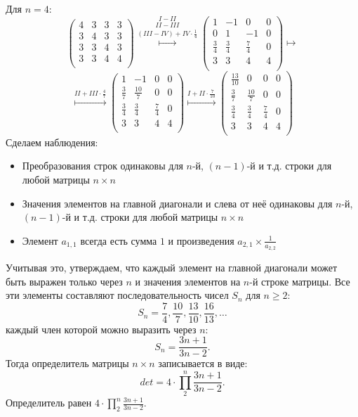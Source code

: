 \documentclass[a4paper,12pt]{article}
\begin{document}
\par
Для $n=4$:
$$
\begin{pmatrix}
4 & 3 & 3 & 3\\
3 & 4 & 3 & 3\\
3 & 3 & 4 & 3\\
3 & 3 & 4 & 4\\
\end{pmatrix}
\overset{I-II}{\overset{II-III}{\overset{(III-IV) + IV \cdot \frac{1}{4}}{\longmapsto}}}
\begin{pmatrix}
1 & -1 & 0 & 0\\
0 & 1 & -1 & 0\\
\frac{3}{4} & \frac{3}{4} & \frac{7}{4} & 0\\
3 & 3 & 4 & 4\\
\end{pmatrix}
\longmapsto
$$
$$
\overset{II+III \cdot \frac{4}{7}}{\longmapsto}
\begin{pmatrix}
1 & -1 & 0 & 0\\
\frac{3}{7} & \frac{10}{7} & 0 & 0\\
\frac{3}{4} & \frac{3}{4} & \frac{7}{4} & 0\\
3 & 3 & 4 & 4\\
\end{pmatrix}
\overset{I+II \cdot \frac{7}{10}}{\longmapsto}
\begin{pmatrix}
\frac{13}{10} & 0 & 0 & 0\\
\frac{3}{7} & \frac{10}{7} & 0 & 0\\
\frac{3}{4} & \frac{3}{4} & \frac{7}{4} & 0\\
3 & 3 & 4 & 4\\
\end{pmatrix}
$$
Сделаем наблюдения:
\begin{itemize}
\item Преобразования строк одинаковы для $n$-й, $(n-1)$-й и т.д. строки для любой матрицы $n \times n$
\item Значения элементов на главной диагонали и слева от неё одинаковы для $n$-й, $(n-1)$-й и т.д. строки для любой матрицы $n \times n$
\item Элемент $a_{1,1}$ всегда есть сумма $1$ и произведения $a_{2,1} \times \frac{1}{a_{2,2}}$
\end{itemize}
Учитывая это, утверждаем, что каждый элемент на главной диагонали может быть выражен только через $n$ и значения элементов на $n$-й строке матрицы. Все эти элементы составляют последовательность чисел $S_n$ для $n \geq 2$:
$$S_n=\frac{7}{4},\frac{10}{7},\frac{13}{10},\frac{16}{13}, \ldots$$
каждый член которой можно выразить через $n$:
$$S_n=\frac{3n + 1}{3n - 2}.$$
Тогда определитель матрицы $n \times n$ записывается в виде:
$$det=4 \cdot \prod_2^{n}\frac{3n + 1}{3n - 2}.$$
 Определитель равен $4 \cdot \prod_2^{n}\frac{3n + 1}{3n - 2}$.
\end{document}
